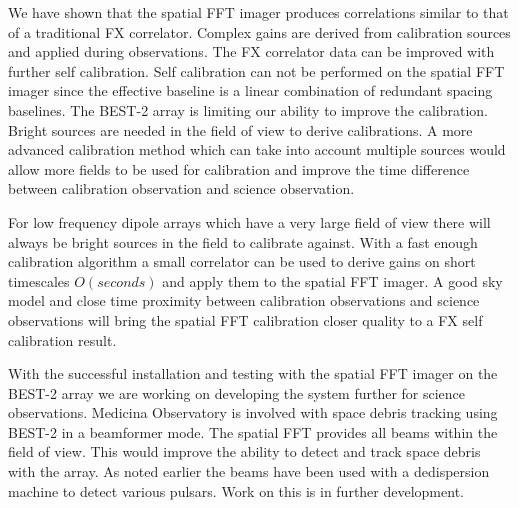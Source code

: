 \documentclass[useAMS,macros,usenatbib]{mn2e}
\begin{document}
We have shown that the spatial FFT imager produces correlations similar to that of a traditional FX correlator.
Complex gains are derived from calibration sources and applied during observations.
The FX correlator data can be improved with further self calibration.
Self calibration can not be performed on the spatial FFT imager since the effective baseline is a linear combination of redundant spacing baselines.
The BEST-2 array is limiting our ability to improve the calibration.
Bright sources are needed in the field of view to derive calibrations.
A more advanced calibration method which can take into account multiple sources would allow more fields to be used for calibration and improve the time difference between calibration observation and science observation.

For low frequency dipole arrays which have a very large field of view there will always be bright sources in the field to calibrate against.
With a fast enough calibration algorithm a small correlator can be used to derive gains on short timescales $O(seconds)$ and apply them to the spatial FFT imager.
A good sky model and close time proximity between calibration observations and science observations will bring the spatial FFT calibration closer quality to a FX self calibration result.

With the successful installation and testing with the spatial FFT imager on the BEST-2 array we are working on developing the system further for science observations.
Medicina Observatory is involved with space debris tracking using BEST-2 in a beamformer mode.
The spatial FFT provides all beams within the field of view.
This would improve the ability to detect and track space debris with the array.
As noted earlier the beams have been used with a dedispersion machine to detect various pulsars.
Work on this is in further development.

\end{document}
